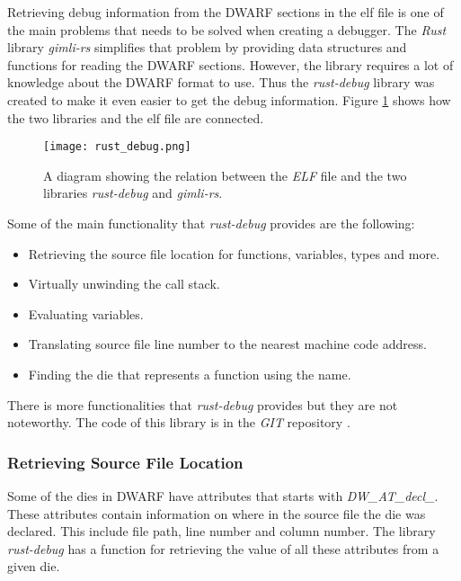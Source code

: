 
Retrieving debug information from the \gls{DWARF} sections in the \gls{elf} file is one of the main problems that needs to be solved when creating a debugger.
The \emph{Rust} library \emph{gimli-rs} simplifies that problem by providing data structures and functions for reading the \gls{DWARF} sections.
However, the library requires a lot of knowledge about the \gls{DWARF} format to use.
Thus the \emph{rust-debug} library was created to make it even easier to get the debug information.
Figure \ref{fig:rustdebug} shows how the two libraries and the \gls{elf} file are connected.


\begin{figure}[h]
	\centering
	\texttt{[image: rust\_debug.png]}
	\caption{A diagram showing the relation between the \emph{ELF} file and the two libraries \emph{rust-debug} and \emph{gimli-rs}.}
	\label{fig:rustdebug}
\end{figure}


Some of the main functionality that \emph{rust-debug} provides are the following:

\begin{itemize}
  \item Retrieving the source file location for functions, variables, types and more.
  \item Virtually unwinding the call stack.
  \item Evaluating variables.
  \item Translating source file line number to the nearest machine code address.
  \item Finding the \gls{die} that represents a function using the name.
\end{itemize}

There is more functionalities that \emph{rust-debug} provides but they are not noteworthy.
The code of this library is in the \emph{GIT} repository \cite{rust-debug}.



\subsubsection{Retrieving Source File Location}
Some of the \glspl{die} in \gls{DWARF} have attributes that starts with \emph{DW\_AT\_decl\_}.
These attributes contain information on where in the source file the \gls{die} was declared.
This include file path, line number and column number.
The library \emph{rust-debug} has a function for retrieving the value of all these attributes from a given \gls{die}.


